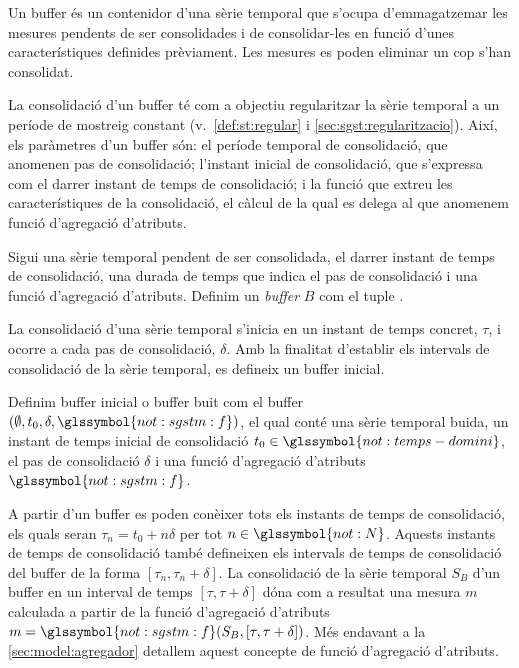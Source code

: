 Un buffer és un contenidor d'una sèrie temporal que s'ocupa
d'emmagatzemar les mesures pendents de ser consolidades i de
consolidar-les en funció d'unes característiques definides
prèviament. Les mesures es poden eliminar un cop s'han consolidat.

La consolidació d'un buffer té com a objectiu regularitzar la sèrie
temporal a un període de mostreig constant
(v.~\autoref{def:st:regular} i \autoref{sec:sgst:regularitzacio}).
Així, els paràmetres d'un buffer són: el període temporal de
consolidació, que anomenen pas de consolidació; l'instant inicial de
consolidació, que s'expressa com el darrer instant de temps de
consolidació; i la funció que extreu les
característiques de la consolidació, el càlcul de la qual es delega al
que anomenem funció d'agregació d'atributs.


\begin{definition}[Buffer]
  Sigui  una sèrie temporal pendent de
  ser consolidada,  el darrer
  instant de temps de consolidació,
   una durada de temps que
  indica el pas de consolidació i  una
  funció d'agregació d'atributs.  Definim un \emph{buffer} $B$ com el
  tuple
  .
\end{definition}

La consolidació d'una sèrie temporal s'inicia en un instant de temps
concret, $\tau$, i ocorre a cada pas de consolidació, $\delta$. Amb la
finalitat d'establir els intervals de consolidació de la sèrie
temporal, es defineix un buffer inicial.

\begin{definition}\label{def:model:buffer_buit}
  Definim buffer inicial o buffer buit com el buffer $(\emptyset,t_0,
  \delta, \glssymbol{not:sgstm:f})$, el qual conté una sèrie temporal
  buida, un instant de temps inicial de consolidació
  $t_0\in\glssymbol{not:temps-domini}$, el pas de consolidació $\delta$ i una
  funció d'agregació d'atributs $\glssymbol{not:sgstm:f}$.
\end{definition}

A partir d'un buffer es poden conèixer tots els instants de temps de
consolidació, els quals seran $\tau_n=t_0+n\delta$ per tot
$n\in\glssymbol{not:N}$. Aquests instants de temps de consolidació
també defineixen els intervals de temps de consolidació del buffer de
la forma $[\tau_n,\tau_n+\delta]$. La consolidació de la sèrie
temporal $S_B$ d'un buffer en un interval de temps
$[\tau,\tau+\delta]$ dóna com a resultat una mesura $m$
calculada a partir de la funció d'agregació d'atributs $m =
\glssymbol{not:sgstm:f}(S_B,[\tau,\tau+\delta])$. Més endavant a la
\autoref{sec:model:agregador} detallem aquest concepte de funció
d'agregació d'atributs.


